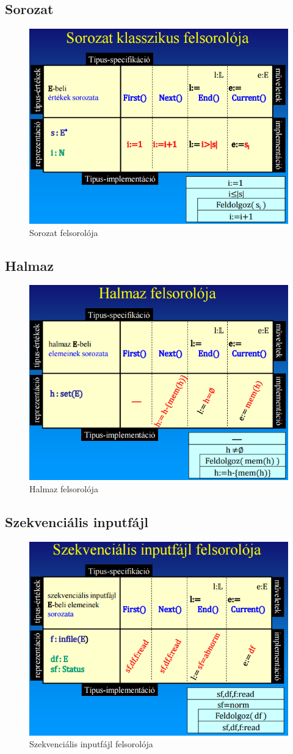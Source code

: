 \documentclass[12pt,margin=0px]{article}
\begin{document}
	\subsection*{Sorozat}
		\begin{figure}[H]
			\centering
			\includegraphics[width=0.7\linewidth]{img/felsorolo_sorozat}
			\caption{Sorozat felsorolója}
			\label{fig:felsorolo_sorozat}
		\end{figure}

	\subsection*{Halmaz}
		\begin{figure}[H]
			\centering
			\includegraphics[width=0.7\linewidth]{img/felsorolo_halmaz}
			\caption{Halmaz felsorolója}
			\label{fig:felsorolo_halmaz}
		\end{figure}

	\subsection*{Szekvenciális inputfájl}
		\begin{figure}[H]
			\centering
			\includegraphics[width=0.7\linewidth]{img/felsorolo_seqin}
			\caption{Szekvenciális inputfájl felsorolója}
			\label{fig:felsorolo_seqin}
		\end{figure}
	
\end{document}
